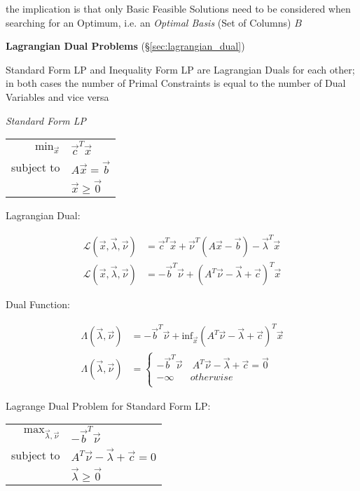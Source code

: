 the implication is that only Basic Feasible Solutions need to be considered
when searching for an Optimum, i.e. an \emph{Optimal Basis} (Set of Columns)
$B$


\textbf{Lagrangian Dual Problems} (\S\ref{sec:lagrangian_dual})

Standard Form LP and Inequality Form LP are Lagrangian Duals for each other; in
both cases the number of Primal Constraints is equal to the number of Dual
Variables and vice versa

\emph{Standard Form LP}

\begin{tabular}{r l}
  $\mathrm{min}_{\vec{x}}$ & $\vec{c}^T\vec{x}$     \\
  subject to               & $A\vec{x} = \vec{b}$   \\
                           & $\vec{x} \geq \vec{0}$ \\
\end{tabular}

Lagrangian Dual:

\begin{align*}
  \mathcal{L}(\vec{x},\vec{\lambda},\vec{\nu}) & =
    \vec{c}^T\vec{x} + \vec{\nu}^T(A\vec{x} - \vec{b}) - \vec{\lambda}^T\vec{x} \\
  \mathcal{L}(\vec{x},\vec{\lambda},\vec{\nu}) & =
    -\vec{b}^T\vec{\nu} + (A^T\vec{\nu} - \vec{\lambda} + \vec{c})^T\vec{x}
\end{align*}

Dual Function:

\begin{align*}
  \Lambda(\vec{\lambda},\vec{\nu}) & = -\vec{b}^T\vec{\nu} +
    \mathrm{inf}_{\vec{x}}(A^T\vec{\nu} - \vec{\lambda} + \vec{c})^T\vec{x} \\
  \Lambda(\vec{\lambda},\vec{\nu}) & = \begin{cases}
    -\vec{b}^T\vec{\nu} & \ A^T\vec{\nu} - \vec{\lambda} + \vec{c} = \vec{0} \\
    -\infty             & otherwise \\
  \end{cases}
\end{align*}

Lagrange Dual Problem for Standard Form LP:

\begin{tabular}{r l}
  $\mathrm{max}_{\vec{\lambda},\vec{\nu}}$ &
    $-\vec{b}^T\vec{\nu}$ \\
  subject to & $A^T\vec{\nu} - \vec{\lambda} + \vec{c} = 0$ \\
             & $\vec{\lambda} \geq \vec{0}$ \\
\end{tabular}

